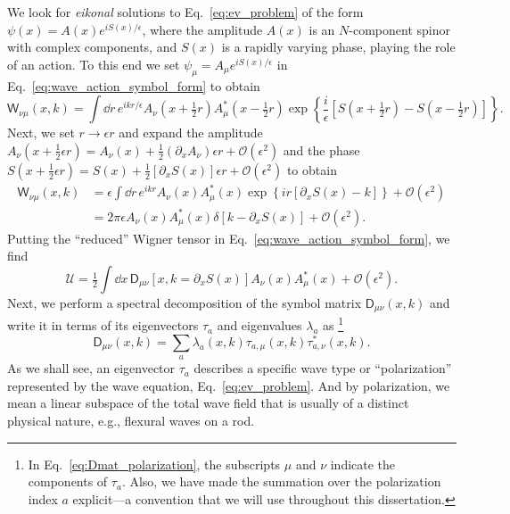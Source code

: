We look for \emph{eikonal} solutions to Eq.~\eqref{eq:ev_problem} of the form $\psi(x) = A(x)e^{iS(x)/\epsilon}$, where the amplitude $A(x)$ is an $N$-component spinor with complex components, and $S(x)$ is a rapidly varying phase, playing the role of an action.
To this end we set $\psi_{\mu} = A_{\mu}e^{iS(x)/\epsilon}$ in Eq.~\eqref{eq:wave_action_symbol_form} to obtain%
%
\begin{equation}
    \mathsf{W}_{\nu\mu}(x, k) = \int \dd{r}\,e^{ikr/\epsilon} A_{\nu}\left(x + \tfrac{1}{2} r\right)A_{\mu}^{*}\left(x - \tfrac{1}{2} r\right)\exp\left\{\frac{i}{\epsilon}\left[S\left(x + \tfrac{1}{2} r\right) - S\left(x - \tfrac{1}{2} r\right)\right]\right\}.
\end{equation}
%
Next, we set $r \to \epsilon r$ and expand the amplitude $A_{\nu}(x + \frac{1}{2}\epsilon r) = A_{\nu}(x) + \frac{1}{2}(\partial_{x}A_{\nu})\epsilon r + \mathcal{O}(\epsilon^{2})$ and the phase $S(x + \frac{1}{2}\epsilon r) = S(x) + \frac{1}{2}[\partial_{x}S(x)]\epsilon r + \mathcal{O}(\epsilon^{2})$ to obtain
%
\begin{equation}
  \begin{aligned}
    \mathsf{W}_{\nu\mu}(x, k) &= \epsilon\int \dd{r}\,e^{ikr} A_{\nu}(x)A_{\mu}^{*}(x)\exp\left\{ir\left[\partial_{x}S(x) - k\right]\right\} + \mathcal{O}(\epsilon^{2}) \\
                        &= 2\pi\epsilon A_{\nu}(x)A^{*}_{\mu}(x)\delta\left[k - \partial_{x}S(x)\right] + \mathcal{O}(\epsilon^{2}).
  \end{aligned}
\end{equation}
%
Putting the ``reduced'' Wigner tensor in Eq.~\eqref{eq:wave_action_symbol_form}, we find
%
\begin{equation}
  \mathscr{U} = \tfrac{1}{2}\int \dd{x}\, \mathsf{D}_{\mu\nu}\left[x, k=\partial_{x}S(x)\right]A_{\nu}(x)A^{*}_{\mu}(x) + \mathcal{O}(\epsilon^{2}).
  \label{eq:wave_action_reduced_1}
\end{equation}
%
Next, we perform a spectral decomposition of the symbol matrix $\mathsf{D}_{\mu\nu}(x, k)$ and write it in terms of its eigenvectors $\tau_{a}$ and eigenvalues $\lambda_{a}$ as%
\footnote{In Eq.~\eqref{eq:Dmat_polarization}, the subscripts $\mu$ and $\nu$ indicate the components of $\tau_{a}$.
Also, we have made the summation over the polarization index $a$ explicit---a convention that we will use throughout this dissertation.}
%
\begin{equation}
  \mathsf{D}_{\mu\nu}(x, k) = \sum_{a} \lambda_{a}(x, k) \tau_{a, \mu}(x, k) \tau_{a, \nu}^{*}(x, k).
  \label{eq:Dmat_polarization}
\end{equation}
%
As we shall see, an eigenvector $\tau_{a}$ describes a specific wave type or ``polarization'' represented by the wave equation, Eq.~\eqref{eq:ev_problem}.
And by polarization, we mean a linear subspace of the total wave field that is usually of a distinct physical nature, e.g., flexural waves on a rod.


